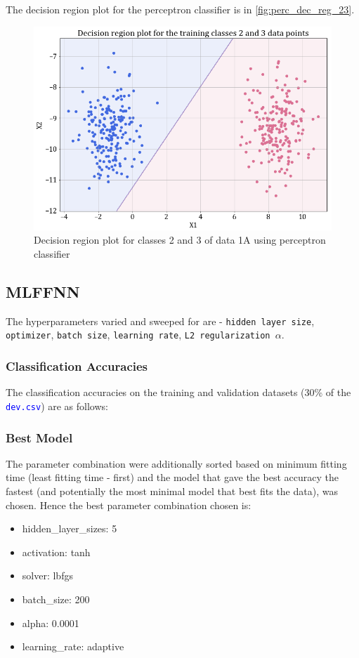 \documentclass[11pt,a4paper]{article}
\newcommand{\noi}{\noindent}
\def\tt#1{\texttt{#1}}
\def\colortt#1{\textcolor{blue}{\texttt{#1}}}
\begin{document}
\noi
The decision region plot for the perceptron classifier is in \autoref{fig:perc_dec_reg_23}.
\begin{figure}[H]
    \centering
    \includegraphics[scale = 0.45]{images/1A_perceptron_training_classes_2_and_3_dec_reg.png}
    \caption{Decision region plot for classes 2 and 3 of data 1A using perceptron classifier}
    \label{fig:perc_dec_reg_23}
\end{figure}

\subsection{MLFFNN}
The hyperparameters varied and sweeped for are - \tt{hidden layer size}, \tt{optimizer}, \tt{batch size}, \tt{learning rate}, \tt{L2 regularization $\alpha$}.

\subsubsection{Classification Accuracies}
The classification accuracies on the training and validation datasets (30\% of the \colortt{dev.csv}) are as follows:


\subsubsection{Best Model}
The parameter combination were additionally sorted based on minimum fitting time (least fitting time - first) and the model that gave the best accuracy the fastest (and potentially the most minimal model that best fits the data), was chosen. Hence the best parameter combination chosen is:
\begin{itemize}
    \itemsep0em
    \item hidden\_layer\_sizes: 5
    \item activation: tanh
    \item solver: lbfgs
    \item batch\_size: 200
    \item alpha: 0.0001
    \item learning\_rate: adaptive
\end{itemize}
\end{document}
